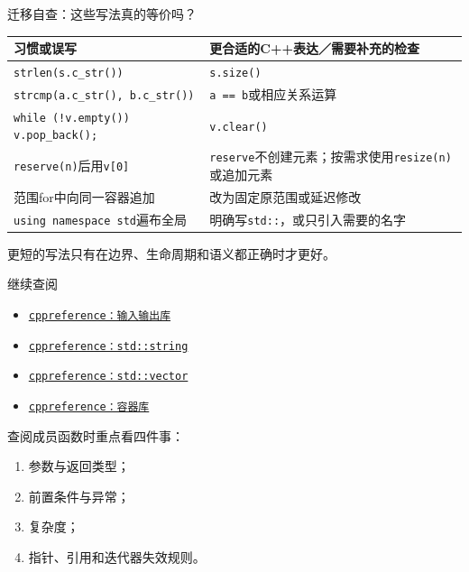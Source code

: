\begin{frame}{迁移自查：这些写法真的等价吗？}
\small
\setlength{\tabcolsep}{4pt}
\renewcommand{\arraystretch}{1.3}
\begin{tabular}{p{}p{}}
\textbf{习惯或误写} & \textbf{更合适的C++表达／需要补充的检查}\\
\hline
\texttt{strlen(s.c\_str())} & \texttt{s.size()}\\
\texttt{strcmp(a.c\_str(), b.c\_str())} & \texttt{a == b}或相应关系运算\\
\texttt{while (!v.empty()) v.pop\_back();} & \texttt{v.clear()}\\
\texttt{reserve(n)}后用\texttt{v[0]} & \texttt{reserve}不创建元素；按需求使用\texttt{resize(n)}或追加元素\\
范围for中向同一容器追加 & 改为固定原范围或延迟修改\\
\texttt{using namespace std}遍布全局 & 明确写\texttt{std::}，或只引入需要的名字
\end{tabular}

\medskip\normalsize
\alert{更短的写法只有在边界、生命周期和语义都正确时才更好。}
\end{frame}

\begin{frame}{继续查阅}
\begin{itemize}
\item \href{https://en.cppreference.com/w/cpp/io}{\texttt{cppreference：输入输出库}}
\item \href{https://en.cppreference.com/w/cpp/string/basic_string}{\texttt{cppreference：std::string}}
\item \href{https://en.cppreference.com/w/cpp/container/vector}{\texttt{cppreference：std::vector}}
\item \href{https://en.cppreference.com/w/cpp/container}{\texttt{cppreference：容器库}}
\end{itemize}
\medskip
查阅成员函数时重点看四件事：
\begin{enumerate}
\item 参数与返回类型；
\item 前置条件与异常；
\item 复杂度；
\item 指针、引用和迭代器失效规则。
\end{enumerate}
\end{frame}

